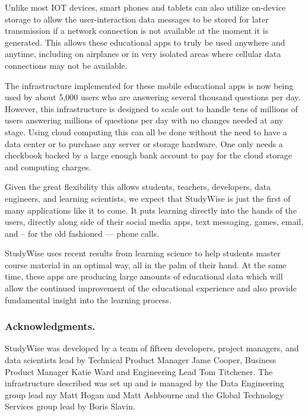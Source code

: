 \documentclass[runningheads,a4paper]{llncs}
\begin{document}
Unlike most IOT devices, smart phones and tablets can also utilize on-device storage to allow the user-interaction data messages to be stored for later transmission if a network connection is not available at the moment it is generated.  This allows these educational apps to truly be used anywhere and anytime, including on airplanes or in very isolated areas where cellular data connections may not be available.

The infrastructure implemented for these mobile educational apps is now being used by about 5,000 users who are answering several thousand questions per day.  However, this infrastructure is designed to scale out to handle tens of millions of users answering millions of questions per day with no changes needed at any stage.  Using cloud computing this can all be done without the need to have a data center or to purchase any server or storage hardware.  One only needs a checkbook backed by a large enough bank account to pay for the cloud storage and computing charges.

Given the great flexibility this allows students, teachers, developers, data engineers, and learning scientists, we expect that StudyWise is just the first of many applications like it to come.  It puts learning directly into the hands of the users, directly along side of their social media apps, text messaging, games, email, and -- for the old fashioned --- phone calls.  

StudyWise uses recent results from learning science to help students master course material in an optimal way, all in the palm of their hand.  At the same time, these apps are producing large amounts of educational data which will allow the continued improvement of the educational experience and also provide fundamental insight into the learning process.

\subsubsection*{Acknowledgments.} StudyWise was developed by a team of  fifteen developers, project managers, and data scientists lead by Technical Product Manager Jame Cooper, Business Product Manager Katie Ward and Engineering Lead Tom Titchener.  The infrastructure described was set up and is managed by the Data Engineering group lead my Matt Hogan and Matt Ashbourne and the Global Technology Services group lead by Boris Slavin.




\end{document}
